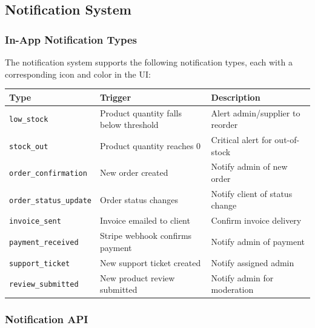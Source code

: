 \documentclass[12pt,onecolumn]{IEEEtran}
\begin{document}
\subsection{Notification System}

\subsubsection{In-App Notification Types}

The notification system supports the following notification types, each with a corresponding icon and color in the UI:

\begin{center}
\begin{tabularx}{\textwidth}{llX}
  \toprule
  \textbf{Type} & \textbf{Trigger} & \textbf{Description} \\
  \midrule
  \texttt{low\_stock}           & Product quantity falls below threshold & Alert admin/supplier to reorder \\
  \texttt{stock\_out}           & Product quantity reaches 0 & Critical alert for out-of-stock \\
  \texttt{order\_confirmation}  & New order created & Notify admin of new order \\
  \texttt{order\_status\_update} & Order status changes & Notify client of status change \\
  \texttt{invoice\_sent}        & Invoice emailed to client & Confirm invoice delivery \\
  \texttt{payment\_received}    & Stripe webhook confirms payment & Notify admin of payment \\
  \texttt{support\_ticket}      & New support ticket created & Notify assigned admin \\
  \texttt{review\_submitted}    & New product review submitted & Notify admin for moderation \\
  \bottomrule
\end{tabularx}
\end{center}

\subsubsection{Notification API}
\end{document}
